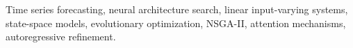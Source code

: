 \documentclass[conference]{IEEEtran}
\begin{document}
\begin{IEEEkeywords}
Time series forecasting, neural architecture search, linear input-varying systems, state-space models, evolutionary optimization, NSGA-II, attention mechanisms, autoregressive refinement.
\end{IEEEkeywords}




\end{document}
